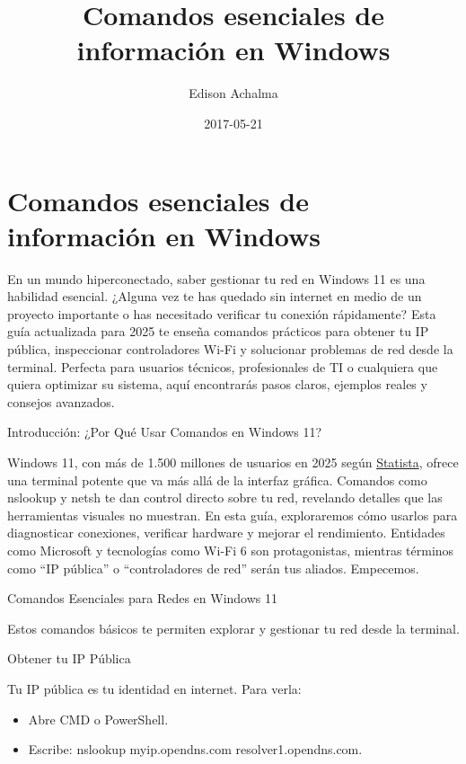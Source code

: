 \documentclass[
  doc,
  floatsintext,
  longtable,
  a4paper,
  nolmodern,
  notxfonts,
  notimes,
  12pt,
  colorlinks=true,linkcolor=blue,citecolor=blue,urlcolor=blue]{apa7}
\title{Comandos esenciales de información en Windows}
\author{Edison Achalma}
\affiliation{
{Escuela Profesional de Economía, Universidad Nacional de San Cristóbal
de Huamanga}}
\date{2017-05-21}
\providecommand{\tightlist}{%
  \setlength{\itemsep}{0pt}\setlength{\parskip}{0pt}}
\begin{document}
\maketitle


\hypertarget{toc}{}
\tableofcontents
\newpage
\section[Introduction]{Comandos esenciales de información en Windows}

\setcounter{secnumdepth}{3}

\setlength\LTleft{0pt}




En un mundo hiperconectado, saber gestionar tu red en Windows 11 es una
habilidad esencial. ¿Alguna vez te has quedado sin internet en medio de
un proyecto importante o has necesitado verificar tu conexión
rápidamente? Esta guía actualizada para 2025 te enseña comandos
prácticos para obtener tu IP pública, inspeccionar controladores Wi-Fi y
solucionar problemas de red desde la terminal. Perfecta para usuarios
técnicos, profesionales de TI o cualquiera que quiera optimizar su
sistema, aquí encontrarás pasos claros, ejemplos reales y consejos
avanzados.

Introducción: ¿Por Qué Usar Comandos en Windows 11?

Windows 11, con más de 1.500 millones de usuarios en 2025 según
\href{https://www.statista.com/}{Statista}, ofrece una terminal potente
que va más allá de la interfaz gráfica. Comandos como nslookup y netsh
te dan control directo sobre tu red, revelando detalles que las
herramientas visuales no muestran. En esta guía, exploraremos cómo
usarlos para diagnosticar conexiones, verificar hardware y mejorar el
rendimiento. Entidades como Microsoft y tecnologías como Wi-Fi 6 son
protagonistas, mientras términos como ``IP pública'' o ``controladores
de red'' serán tus aliados. Empecemos.

Comandos Esenciales para Redes en Windows 11

Estos comandos básicos te permiten explorar y gestionar tu red desde la
terminal.

Obtener tu IP Pública

Tu IP pública es tu identidad en internet. Para verla:

\begin{itemize}
\tightlist
\item
  Abre CMD o PowerShell.
\item
  Escribe: nslookup myip.opendns.com resolver1.opendns.com.
\end{itemize}
\end{document}
